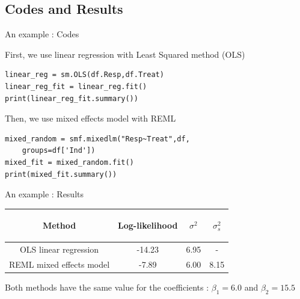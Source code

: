 \documentclass[unknownkeysallowed]{beamer}
\begin{document}
\subsection{Codes and Results}
\label{sub:Codes and Results}


\begin{frame}[fragile]{An example : Codes}

First, we use linear regression with Least Squared method (OLS)
\begin{lstlisting}
linear_reg = sm.OLS(df.Resp,df.Treat)
linear_reg_fit = linear_reg.fit()
print(linear_reg_fit.summary())
\end{lstlisting}
\vspace{0.5cm}
Then, we use mixed effects model with REML
\begin{lstlisting}
mixed_random = smf.mixedlm("Resp~Treat",df,
    groups=df['Ind'])
mixed_fit = mixed_random.fit()
print(mixed_fit.summary())
\end{lstlisting}
\end{frame}



\begin{frame}{An example : Results}

\begin{table}[h!]
    \centering
    \begin{tabular}{| c | c | c|c|}
        \hline
        \begin{bf} Method \end{bf} &
        \begin{bf} Log-likelihood \end{bf} &
        \begin{bf} $\sigma^2$ \end{bf} &
        \begin{bf} $\sigma_s^2$ \end{bf} \\
        \hline
        OLS linear regression &  -14.23 & 6.95 & -\\
        REML mixed effects model  & -7.89 & 6.00 & 8.15 \\
        \hline
    \end{tabular}
\end{table}
\vspace{1cm}
Both methods have the same value for the coefficients : $\beta_1=6.0$ and $\beta_2=15.5$
\end{frame}
\end{document}
